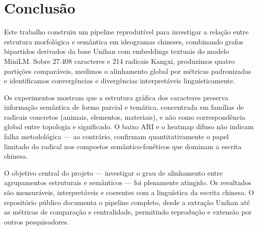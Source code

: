 \documentclass[10pt, a4paper, titlepage]{extarticle}
\begin{document}
\section{Conclusão}
Este trabalho construiu um pipeline reprodutível para investigar a relação entre estrutura morfológica e semântica em ideogramas chineses,
combinando grafos bipartidos derivados da base Unihan com embeddings textuais do modelo MiniLM. Sobre 27.408 caracteres e 214 radicais Kangxi, produzimos quatro partições comparáveis, medimos o alinhamento global por métricas padronizadas e identificamos convergências e divergências interpretáveis linguisticamente.

Os experimentos mostram que a estrutura gráfica dos caracteres preserva informação semântica de forma parcial e temática, concentrada em famílias de radicais concretos (animais, elementos, materiais), e não como correspondência global entre topologia e significado. O baixo ARI e o heatmap difuso não indicam falha metodológica --- ao contrário, confirmam quantitativamente o papel limitado do radical nos compostos semântico-fonéticos que dominam a escrita chinesa.

O objetivo central do projeto --- investigar o grau de alinhamento entre agrupamentos estruturais e semânticos --- foi plenamente atingido. Os resultados são mensuráveis, interpretáveis e coerentes com a linguística da escrita chinesa. O repositório público documenta o pipeline completo, desde a extração Unihan até as métricas de comparação e centralidade, permitindo reprodução e extensão por outros pesquisadores.
\end{document}
